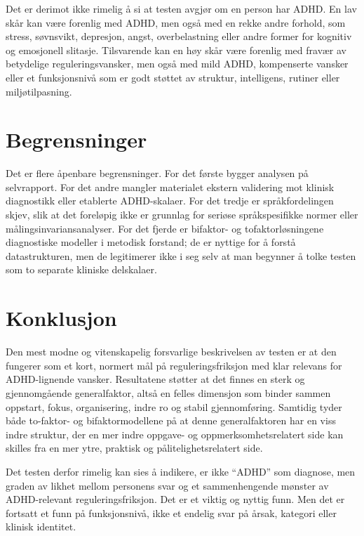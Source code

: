 \documentclass[11pt,a4paper]{article}
\begin{document}
Det er derimot ikke rimelig å si at testen avgjør om en person har ADHD. En lav skår kan være forenlig med ADHD, men også med en rekke andre forhold, som stress, søvnsvikt, depresjon, angst, overbelastning eller andre former for kognitiv og emosjonell slitasje. Tilsvarende kan en høy skår være forenlig med fravær av betydelige reguleringsvansker, men også med mild ADHD, kompenserte vansker eller et funksjonsnivå som er godt støttet av struktur, intelligens, rutiner eller miljøtilpasning.

\section{Begrensninger}
Det er flere åpenbare begrensninger. For det første bygger analysen på selvrapport. For det andre mangler materialet ekstern validering mot klinisk diagnostikk eller etablerte ADHD-skalaer. For det tredje er språkfordelingen skjev, slik at det foreløpig ikke er grunnlag for seriøse språkspesifikke normer eller målingsinvariansanalyser. For det fjerde er bifaktor- og tofaktorløsningene diagnostiske modeller i metodisk forstand; de er nyttige for å forstå datastrukturen, men de legitimerer ikke i seg selv at man begynner å tolke testen som to separate kliniske delskalaer.

\section{Konklusjon}
Den mest modne og vitenskapelig forsvarlige beskrivelsen av testen er at den fungerer som et kort, normert mål på reguleringsfriksjon med klar relevans for ADHD-lignende vansker. Resultatene støtter at det finnes en sterk og gjennomgående generalfaktor, altså en felles dimensjon som binder sammen oppstart, fokus, organisering, indre ro og stabil gjennomføring. Samtidig tyder både to-faktor- og bifaktormodellene på at denne generalfaktoren har en viss indre struktur, der en mer indre oppgave- og oppmerksomhetsrelatert side kan skilles fra en mer ytre, praktisk og pålitelighetsrelatert side.

Det testen derfor rimelig kan sies å indikere, er ikke ``ADHD'' som diagnose, men graden av likhet mellom personens svar og et sammenhengende mønster av ADHD-relevant reguleringsfriksjon. Det er et viktig og nyttig funn. Men det er fortsatt et funn på funksjonsnivå, ikke et endelig svar på årsak, kategori eller klinisk identitet.

\printbibliography
\end{document}
